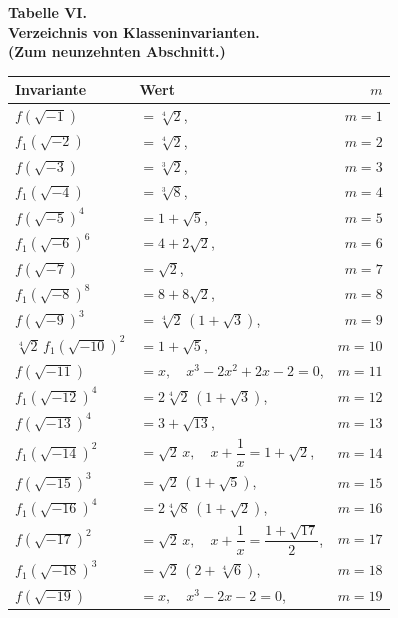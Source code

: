 \documentclass[12pt,a4paper]{article}
\begin{document}
\newpage
\setcounter{page}{721}

\begin{center}
\large\textbf{Tabelle VI.}\\[4pt]
\textbf{Verzeichnis von Klasseninvarianten.}\\[2pt]
\textbf{(Zum neunzehnten Abschnitt.)}
\end{center}

\medskip

\begin{longtable}{@{}llr@{}}
\toprule
\multicolumn{1}{l}{\textbf{Invariante}} & \multicolumn{1}{l}{\textbf{Wert}} & $m$ \\
\midrule
\endhead
$f(\sqrt{-1})$ &$= \sqrt[4]{2}$, & $m=1$ \\
$f_1(\sqrt{-2})$ &$= \sqrt[4]{2}$, & $m=2$ \\
$f(\sqrt{-3})$ &$= \sqrt[3]{2}$, & $m=3$ \\
$f_1(\sqrt{-4})$ &$= \sqrt[3]{8}$, & $m=4$ \\
$f(\sqrt{-5})^4$ &$= 1+\sqrt{5}$, & $m=5$ \\
$f_1(\sqrt{-6})^6$ &$= 4+2\sqrt{2}$, & $m=6$ \\
$f(\sqrt{-7})$ &$= \sqrt{2}$, & $m=7$ \\
$f_1(\sqrt{-8})^8$ &$= 8+8\sqrt{2}$, & $m=8$ \\
$f(\sqrt{-9})^3$ &$= \sqrt[4]{2}\,(1+\sqrt{3})$, & $m=9$ \\
$\sqrt[4]{2}\,f_1(\sqrt{-10})^2$ &$= 1+\sqrt{5}$, & $m=10$ \\
$f(\sqrt{-11})$ &$= x,\quad x^3-2x^2+2x-2=0$, & $m=11$ \\
$f_1(\sqrt{-12})^4$ &$= 2\sqrt[4]{2}\,(1+\sqrt{3})$, & $m=12$ \\
$f(\sqrt{-13})^4$ &$= 3+\sqrt{13}$, & $m=13$ \\
$f_1(\sqrt{-14})^2$ &$= \sqrt{2}\,x,\quad x+\dfrac{1}{x}=1+\sqrt{2}$, & $m=14$ \\
$f(\sqrt{-15})^3$ &$= \sqrt{2}\,(1+\sqrt{5})$, & $m=15$ \\
$f_1(\sqrt{-16})^4$ &$= 2\sqrt[4]{8}\,(1+\sqrt{2})$, & $m=16$ \\
$f(\sqrt{-17})^2$ &$= \sqrt{2}\,x,\quad x+\dfrac{1}{x}=\dfrac{1+\sqrt{17}}{2}$, & $m=17$ \\
$f_1(\sqrt{-18})^3$ &$= \sqrt{2}\,(2+\sqrt[4]{6})$, & $m=18$ \\
$f(\sqrt{-19})$ &$= x,\quad x^3-2x-2=0$, & $m=19$ \\
\bottomrule
\end{longtable}
\end{document}
